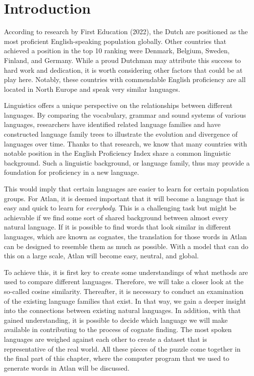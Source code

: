 \section{Introduction}

According to research by First Education (2022), the Dutch are positioned as the most proficient English-speaking population globally. Other countries that achieved a position in the top 10 ranking were Denmark, Belgium, Sweden, Finland, and Germany. While a proud Dutchman may attribute this success to hard work and dedication, it is worth considering other factors that could be at play here. Notably, these countries with commendable English proficiency are all located in North Europe and speak very similar languages.  

Linguistics offers a unique perspective on the relationships between different languages. By comparing the vocabulary, grammar and sound systems of various languages, researchers have identified related language families and have constructed language family trees to illustrate the evolution and divergence of languages over time. Thanks to that research, we know that many countries with notable position in the English Proficiency Index share a common linguistic background. Such a linguistic background, or language family, thus may provide a foundation for proficiency in a new language. 

This would imply that certain languages are easier to learn for certain population groups. For Atlan, it is deemed important that it will become a language that is easy and quick to learn for \textit{everybody}. This is a challenging task but might be achievable if we find some sort of shared background between almost every natural language. If it is possible to find words that look similar in different languages, which are known as cognates, the translation for those words in Atlan can be designed to resemble them as much as possible. With a model that can do this on a large scale, Atlan will become easy, neutral, and global.  

To achieve this, it is first key to create some understandings of what methods are used to compare different languages. Therefore, we will take a closer look at the so-called cosine similarity. Thereafter, it is necessary to conduct an examination of the existing language families that exist. In that way, we gain a deeper insight into the connections between existing natural languages. In addition, with that gained understanding, it is possible to decide which language we will make available in contributing to the process of cognate finding. The most spoken languages are weighed against each other to create a dataset that is representative of the real world. All these pieces of the puzzle come together in the final part of this chapter, where the computer program that we used to generate words in Atlan will be discussed.

